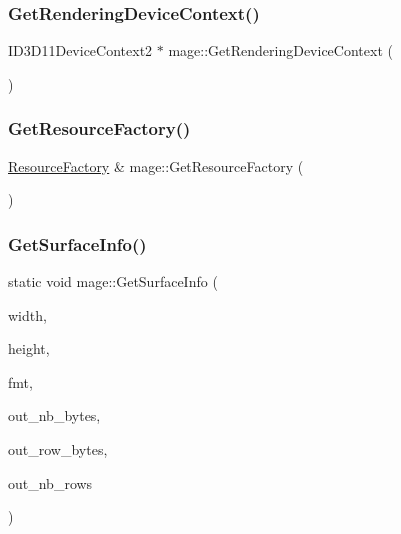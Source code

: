 \subsubsection{\texorpdfstring{Get\+Rendering\+Device\+Context()}{GetRenderingDeviceContext()}}
{\footnotesize\ttfamily I\+D3\+D11\+Device\+Context2 $\ast$ mage\+::\+Get\+Rendering\+Device\+Context (\begin{DoxyParamCaption}{ }\end{DoxyParamCaption})}

\hypertarget{namespacemage_ad773a6b6442b973421222b664229e86d}{}\label{namespacemage_ad773a6b6442b973421222b664229e86d} 
\subsubsection{\texorpdfstring{Get\+Resource\+Factory()}{GetResourceFactory()}}
{\footnotesize\ttfamily \hyperlink{classmage_1_1_resource_factory}{Resource\+Factory} \& mage\+::\+Get\+Resource\+Factory (\begin{DoxyParamCaption}{ }\end{DoxyParamCaption})}

\hypertarget{namespacemage_a7b67bb6f38f3e787fb3561d236b88bd2}{}\label{namespacemage_a7b67bb6f38f3e787fb3561d236b88bd2} 
\subsubsection{\texorpdfstring{Get\+Surface\+Info()}{GetSurfaceInfo()}}
{\footnotesize\ttfamily static void mage\+::\+Get\+Surface\+Info (\begin{DoxyParamCaption}\item[{\+\_\+\+In\+\_\+ size\+\_\+t}]{width,  }\item[{\+\_\+\+In\+\_\+ size\+\_\+t}]{height,  }\item[{\+\_\+\+In\+\_\+ D\+X\+G\+I\+\_\+\+F\+O\+R\+M\+AT}]{fmt,  }\item[{\+\_\+\+Out\+\_\+opt\+\_\+ size\+\_\+t $\ast$}]{out\+\_\+nb\+\_\+bytes,  }\item[{\+\_\+\+Out\+\_\+opt\+\_\+ size\+\_\+t $\ast$}]{out\+\_\+row\+\_\+bytes,  }\item[{\+\_\+\+Out\+\_\+opt\+\_\+ size\+\_\+t $\ast$}]{out\+\_\+nb\+\_\+rows }\end{DoxyParamCaption})\hspace{0.3cm}{\ttfamily [static]}}

